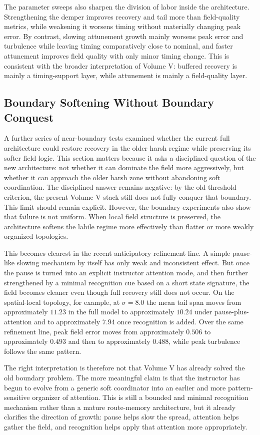 \documentclass[12pt,a4paper]{article}
\begin{document}
The parameter sweeps also sharpen the division of labor inside the architecture. Strengthening the demper improves recovery and tail more than field-quality metrics, while weakening it worsens timing without materially changing peak error. By contrast, slowing attunement growth mainly worsens peak error and turbulence while leaving timing comparatively close to nominal, and faster attunement improves field quality with only minor timing change. This is consistent with the broader interpretation of Volume V: buffered recovery is mainly a timing-support layer, while attunement is mainly a field-quality layer.

\subsection{Boundary Softening Without Boundary Conquest}
A further series of near-boundary tests examined whether the current full architecture could restore recovery in the older harsh regime while preserving its softer field logic. This section matters because it asks a disciplined question of the new architecture: not whether it can dominate the field more aggressively, but whether it can approach the older harsh zone without abandoning soft coordination. The disciplined answer remains negative: by the old threshold criterion, the present Volume V stack still does not fully conquer that boundary. This limit should remain explicit. However, the boundary experiments also show that failure is not uniform. When local field structure is preserved, the architecture softens the labile regime more effectively than flatter or more weakly organized topologies.

This becomes clearest in the recent anticipatory refinement line. A simple pause-like slowing mechanism by itself has only weak and inconsistent effect. But once the pause is turned into an explicit instructor attention mode, and then further strengthened by a minimal recognition cue based on a short state signature, the field becomes cleaner even though full recovery still does not occur. On the spatial-local topology, for example, at $\sigma = 8.0$ the mean tail span moves from approximately $11.23$ in the full model to approximately $10.24$ under pause-plus-attention and to approximately $7.94$ once recognition is added. Over the same refinement line, peak field error moves from approximately $0.506$ to approximately $0.493$ and then to approximately $0.488$, while peak turbulence follows the same pattern.

The right interpretation is therefore not that Volume V has already solved the old boundary problem. The more meaningful claim is that the instructor has begun to evolve from a generic soft coordinator into an earlier and more pattern-sensitive organizer of attention. This is still a bounded and minimal recognition mechanism rather than a mature route-memory architecture, but it already clarifies the direction of growth: pause helps slow the spread, attention helps gather the field, and recognition helps apply that attention more appropriately.
\end{document}
